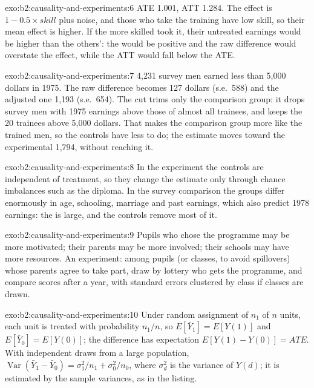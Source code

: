 \begin{solution}{exo:b2:causality-and-experiments:6}
ATE 1.001, ATT 1.284. The effect is $1 - 0.5 \times \mathit{skill}$ plus noise, and those who take the training have low
skill, so their mean effect is higher. If the more skilled took it, their untreated earnings would be higher than the
others': the  would be positive and the raw difference would overstate the effect, while the ATT would fall
below the ATE.
\end{solution}

\begin{solution}{exo:b2:causality-and-experiments:7}
4,231 survey men earned less than 5,000 dollars in 1975. The raw difference becomes 127 dollars (s.e.\ 588) and the
adjusted one 1,193 (s.e.\ 654). The cut trims only the comparison group: it drops survey men with 1975 earnings above those of almost all
trainees, and keeps the 20 trainees above 5,000 dollars. That makes the comparison group more like the trained men, so the controls have less to do; the estimate moves toward the experimental 1,794, without
reaching it.
\end{solution}

\begin{solution}{exo:b2:causality-and-experiments:8}
In the experiment the controls are independent of treatment, so they change the estimate only through chance imbalances
such as the diploma. In the survey comparison the groups differ enormously in age, schooling, marriage and past earnings,
which also predict 1978 earnings: the  is large, and the controls remove most of it.
\end{solution}

\begin{solution}{exo:b2:causality-and-experiments:9}
Pupils who chose the programme may be more motivated; their parents may be more involved; their schools may have more
resources. An experiment: among pupils (or classes, to avoid spillovers) whose parents agree to take part, draw by lottery
who gets the programme, and compare scores after a year, with standard errors clustered by class if classes are drawn.
\end{solution}

\begin{solution}{exo:b2:causality-and-experiments:10}
Under random assignment of $n_1$ of $n$ units, each unit is treated with probability $n_1/n$, so $E[\bar Y_1] =
E[Y(1)]$ and $E[\bar Y_0] = E[Y(0)]$; the difference has expectation $E[Y(1) - Y(0)] = \mathit{ATE}$. With
independent draws from a large population, $\operatorname{Var}(\bar Y_1 - \bar Y_0) = \sigma_1^2/n_1 + \sigma_0^2/n_0$,
where $\sigma_d^2$ is the variance of $Y(d)$; it is estimated by the sample variances, as in the listing.
\end{solution}

